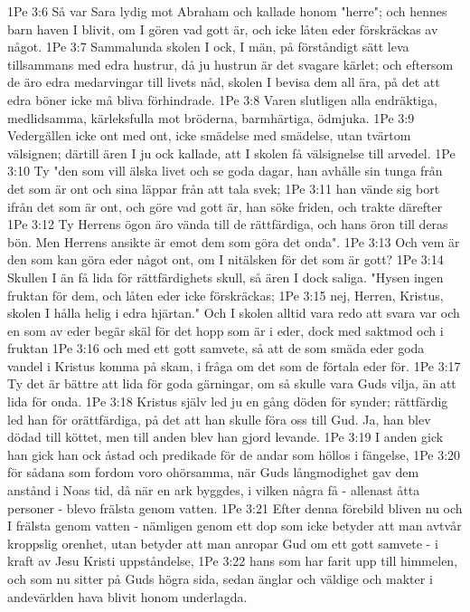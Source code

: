 1Pe 3:6  Så var Sara lydig mot Abraham och kallade honom "herre"; och hennes barn haven I blivit, om I gören vad gott är, och icke låten eder förskräckas av något.
1Pe 3:7  Sammalunda skolen I ock, I män, på förståndigt sätt leva tillsammans med edra hustrur, då ju hustrun är det svagare kärlet; och eftersom de äro edra medarvingar till livets nåd, skolen I bevisa dem all ära, på det att edra böner icke må bliva förhindrade.
1Pe 3:8  Varen slutligen alla endräktiga, medlidsamma, kärleksfulla mot bröderna, barmhärtiga, ödmjuka.
1Pe 3:9  Vedergällen icke ont med ont, icke smädelse med smädelse, utan tvärtom välsignen; därtill ären I ju ock kallade, att I skolen få välsignelse till arvedel.
1Pe 3:10  Ty "den som vill älska livet och se goda dagar, han avhålle sin tunga från det som är ont och sina läppar från att tala svek;
1Pe 3:11  han vände sig bort ifrån det som är ont, och göre vad gott är, han söke friden, och trakte därefter
1Pe 3:12  Ty Herrens ögon äro vända till de rättfärdiga, och hans öron till deras bön. Men Herrens ansikte är emot dem som göra det onda".
1Pe 3:13  Och vem är den som kan göra eder något ont, om I nitälsken för det som är gott?
1Pe 3:14  Skullen I än få lida för rättfärdighets skull, så ären I dock saliga. "Hysen ingen fruktan för dem, och låten eder icke förskräckas;
1Pe 3:15  nej, Herren, Kristus, skolen I hålla helig i edra hjärtan." Och I skolen alltid vara redo att svara var och en som av eder begär skäl för det hopp som är i eder, dock med saktmod och i fruktan
1Pe 3:16  och med ett gott samvete, så att de som smäda eder goda vandel i Kristus komma på skam, i fråga om det som de förtala eder för.
1Pe 3:17  Ty det är bättre att lida för goda gärningar, om så skulle vara Guds vilja, än att lida för onda.
1Pe 3:18  Kristus själv led ju en gång döden för synder; rättfärdig led han för orättfärdiga, på det att han skulle föra oss till Gud. Ja, han blev dödad till köttet, men till anden blev han gjord levande.
1Pe 3:19  I anden gick han gick han ock åstad och predikade för de andar som höllos i fängelse,
1Pe 3:20  för sådana som fordom voro ohörsamma, när Guds långmodighet gav dem anstånd i Noas tid, då när en ark byggdes, i vilken några få - allenast åtta personer - blevo frälsta genom vatten.
1Pe 3:21  Efter denna förebild bliven nu och I frälsta genom vatten - nämligen genom ett dop som icke betyder att man avtvår kroppslig orenhet, utan betyder att man anropar Gud om ett gott samvete - i kraft av Jesu Kristi uppståndelse,
1Pe 3:22  hans som har farit upp till himmelen, och som nu sitter på Guds högra sida, sedan änglar och väldige och makter i andevärlden hava blivit honom underlagda.
